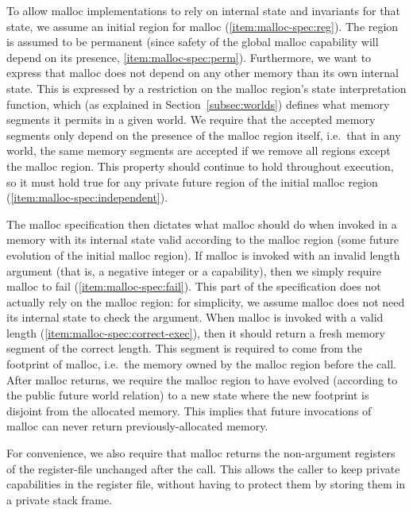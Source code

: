 \documentclass[format=acmsmall, review=true, screen=true]{acmart}
\renewcommand{\sectionname}{Section}
\newenvironment{toplas}{}{}
\begin{document}
\begin{toplas}
To allow malloc implementations to rely on internal state and invariants for
that state, we assume an initial region for malloc (\ref{item:malloc-spec:reg}). The region is assumed to be
permanent (since safety of the global malloc capability will depend on its
presence, \ref{item:malloc-spec:perm}).
Furthermore, we want to express that malloc does not depend on any other memory
than its own internal state. This is expressed by a restriction on the malloc
region's state interpretation function, which (as explained in
\sectionname~\ref{subsec:worlds}) defines what memory segments it permits in a
given world. We require that the accepted memory segments only depend on the
presence of the malloc region itself, i.e.\ that in any world, the same memory
segments are accepted if we remove all regions except the malloc region. This
property should continue to hold throughout execution, so it must hold true for
any private future region of the initial malloc region (\ref{item:malloc-spec:independent}).

The malloc specification then dictates what malloc should do when invoked in a
memory with its internal state valid according to the malloc region (some future
evolution of the initial malloc region). If malloc is invoked with an invalid
length argument (that is, a negative integer or a capability), then we simply
require malloc to fail (\ref{item:malloc-spec:fail}). This part of the
specification does not actually rely on the malloc region: for simplicity, we
assume malloc does not need its internal state to check the argument. When
malloc is invoked with a valid length (\ref{item:malloc-spec:correct-exec}),
then it should return a fresh memory segment of the correct length. This segment
is required to come from the footprint of malloc, i.e.\ the memory owned by the
malloc region before the call. After malloc returns, we require the malloc
region to have evolved (according to the public future world relation) to a new
state where the new footprint is disjoint from the allocated memory. This
implies that future invocations of malloc can never return previously-allocated
memory.

For convenience, we also require that malloc returns the non-argument registers
of the register-file unchanged after the call. This allows the caller to keep
private capabilities in the register file, without having to protect them by
storing them in a private stack frame.


\end{toplas}
\end{document}
